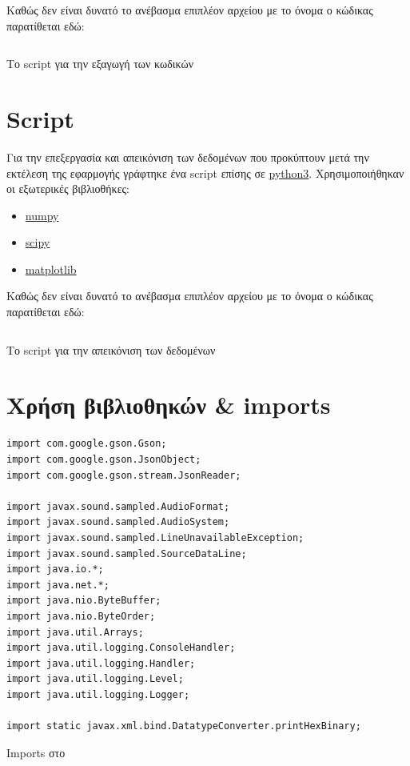 Καθώς δεν είναι δυνατό το ανέβασμα επιπλέον αρχείου με το όνομα \scriptname{} ο κώδικας παρατίθεται εδώ:
\begin{code}
\inputminted[frame=single, breaklines=true, linenos=true, python3=true]{python}{../../extract-codes.py}
\caption{Το script για την εξαγωγή των κωδικών}
\end{code}

\section{Script \plotscriptname{}}\label{section:plot-script}
Για την επεξεργασία και απεικόνιση των δεδομένων που προκύπτουν μετά την εκτέλεση της εφαρμογής \appname{} γράφτηκε ένα script επίσης σε \href{https://www.python.org/}{python3}.
Χρησιμοποιήθηκαν οι εξωτερικές βιβλιοθήκες:
\begin{itemize}
\item \href{http://www.numpy.org/}{numpy}
\item \href{https://www.scipy.org/}{scipy}
\item \href{http://matplotlib.org/}{matplotlib}
\end{itemize}

Καθώς δεν είναι δυνατό το ανέβασμα επιπλέον αρχείου με το όνομα \plotscriptname{} ο κώδικας παρατίθεται εδώ:
\begin{code}
\inputminted[frame=single, breaklines=true, linenos=true, python3=true]{python}{../../graphs.py}
\caption{Το script για την απεικόνιση των δεδομένων}
\end{code}

\section{Χρήση βιβλιοθηκών \& imports}
\begin{code}
\begin{verbatim}
import com.google.gson.Gson;
import com.google.gson.JsonObject;
import com.google.gson.stream.JsonReader;

import javax.sound.sampled.AudioFormat;
import javax.sound.sampled.AudioSystem;
import javax.sound.sampled.LineUnavailableException;
import javax.sound.sampled.SourceDataLine;
import java.io.*;
import java.net.*;
import java.nio.ByteBuffer;
import java.nio.ByteOrder;
import java.util.Arrays;
import java.util.logging.ConsoleHandler;
import java.util.logging.Handler;
import java.util.logging.Level;
import java.util.logging.Logger;

import static javax.xml.bind.DatatypeConverter.printHexBinary;
\end{verbatim}
\caption{Imports στο \appname}
\end{code}

